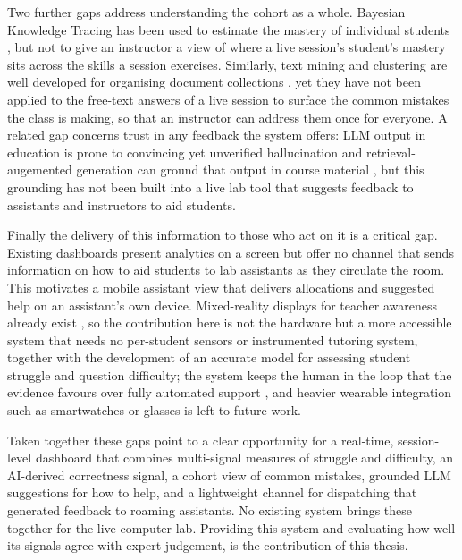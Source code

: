 Two further gaps address understanding the cohort as a whole. Bayesian Knowledge Tracing has been used to estimate the mastery of individual students \cite{corbettKnowledgeTracingModeling1995, yudelsonIndividualizedBayesianKnowledge2013}, but not to give an instructor a view of where a live session's student's mastery sits across the skills a session exercises. Similarly, text mining and clustering are well developed for organising document collections \cite{saltonVectorSpaceModel1975, MacQueen1967SomeMF}, yet they have not been applied to the free-text answers of a live session to surface the common mistakes the class is making, so that an instructor can address them once for everyone. 
A related gap concerns trust in any feedback the system offers: LLM output in education is prone to convincing yet unverified hallucination \cite{kasneciChatGPTGoodOpportunities2023} and retrieval-augemented generation can ground that output in course material \cite{lewisRetrievalAugmentedGenerationKnowledgeIntensive2020}, but this grounding has not been built into a live lab tool that suggests feedback to assistants and instructors to aid students.

Finally the delivery of this information to those who act on it is a critical gap. 
Existing dashboards present analytics on a screen but offer no channel that sends information on how to aid students to lab assistants as they circulate the room. 
This motivates a mobile assistant view that delivers allocations and suggested help on an assistant's own device. 
Mixed-reality displays for teacher awareness already exist \cite{holsteinStudentLearningBenefits2018}, so the contribution here is not the hardware but a more accessible system that needs no per-student sensors or instrumented tutoring system, together with the development of an accurate model for assessing student struggle and question difficulty; the system keeps the human in the loop that the evidence favours over fully automated support \cite{pitts_a}, and heavier wearable integration such as smartwatches or glasses is left to future work.



Taken together these gaps point to a clear opportunity for a real-time, session-level dashboard that combines multi-signal measures of struggle and difficulty, an AI-derived correctness signal, a cohort view of common mistakes, grounded LLM suggestions for how to help, and a lightweight channel for dispatching that generated feedback to roaming assistants. No existing system brings these together for the live computer lab. Providing this system and evaluating how well its signals agree with expert judgement, is the contribution of this thesis.

